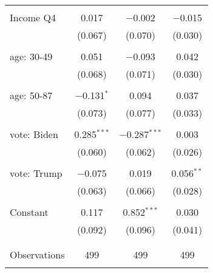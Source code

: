 \begin{tabular}{@{\extracolsep{5pt}}lccc}
  & & & \\ 
 Income Q4 & 0.017 & $-$0.002 & $-$0.015 \\ 
  & (0.067) & (0.070) & (0.030) \\ 
  & & & \\ 
 age: 30-49 & 0.051 & $-$0.093 & 0.042 \\ 
  & (0.068) & (0.071) & (0.030) \\ 
  & & & \\ 
 age: 50-87 & $-$0.131$^{*}$ & 0.094 & 0.037 \\ 
  & (0.073) & (0.077) & (0.033) \\ 
  & & & \\ 
 vote: Biden & 0.285$^{***}$ & $-$0.287$^{***}$ & 0.003 \\ 
  & (0.060) & (0.062) & (0.026) \\ 
  & & & \\ 
 vote: Trump & $-$0.075 & 0.019 & 0.056$^{**}$ \\ 
  & (0.063) & (0.066) & (0.028) \\ 
  & & & \\ 
 Constant & 0.117 & 0.852$^{***}$ & 0.030 \\ 
  & (0.092) & (0.096) & (0.041) \\ 
  & & & \\ 
\hline \\[-1.8ex] 

Observations & 499 & 499 & 499 \\ 
\hline 
\hline \\[-1.8ex] 
\end{tabular} 